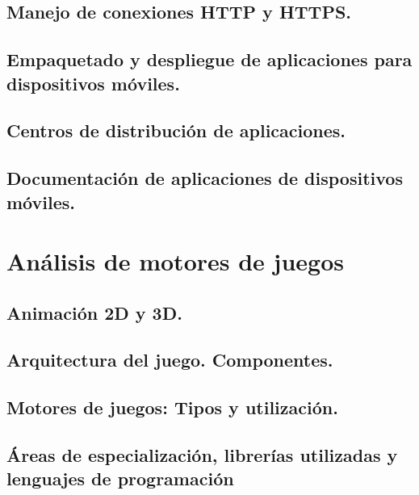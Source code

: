 \documentclass[a4paper,12pt,spanish]{sphinxmanual}
\begin{document}
\section{Manejo de conexiones HTTP y HTTPS.}
\label{tema2:manejo-de-conexiones-http-y-https}

\section{Empaquetado y despliegue de aplicaciones para dispositivos móviles.}
\label{tema2:empaquetado-y-despliegue-de-aplicaciones-para-dispositivos-moviles}

\section{Centros de distribución de aplicaciones.}
\label{tema2:centros-de-distribucion-de-aplicaciones}

\section{Documentación de aplicaciones de dispositivos móviles.}
\label{tema2:documentacion-de-aplicaciones-de-dispositivos-moviles}

\chapter{Análisis de motores de juegos}
\label{index:analisis-de-motores-de-juegos}

\section{Animación 2D y 3D.}
\label{index:animacion-2d-y-3d}

\section{Arquitectura del juego. Componentes.}
\label{index:arquitectura-del-juego-componentes}

\section{Motores de juegos: Tipos y utilización.}
\label{index:motores-de-juegos-tipos-y-utilizacion}

\section{Áreas de especialización, librerías utilizadas y lenguajes de programación}
\label{index:areas-de-especializacion-librerias-utilizadas-y-lenguajes-de-programacion}
\end{document}
